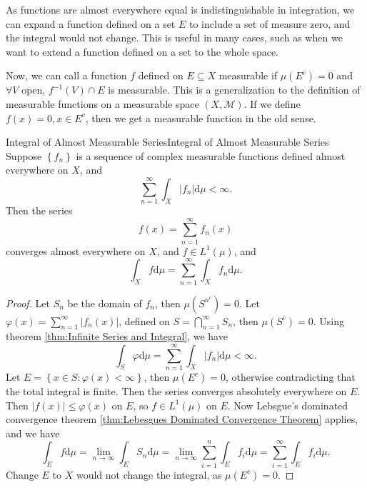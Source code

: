 \documentclass[../main.tex]{subfiles}
\begin{document}
\begin{remark}
	As functions are almost everywhere equal is indistinguishable in integration, we can expand a function defined on a set $E$ to include a set of measure zero, and the integral would not change. This is useful in many cases, such as when we want to extend a function defined on a set to the whole space.
\end{remark}

Now, we can call a function $f$ defined on $E \subseteq X$ measurable if $\mu(E^c)=0$ and $\forall V$ open, $f^{-1}(V)\cap E$ is measurable. This is a generalization to the definition of measurable functions on a measurable space $(X, \mathcal{M})$. If we define $f(x)=0,x\in E^c$, then we get a measurable function in the old sense.

\begin{theorem}{Integral of Almost Measurable Series}{Integral of Almost Measurable Series}
	Suppose $\left\{ f_n \right\}$ is a sequence of complex measurable functions defined almost everywhere on $X$, and
	\begin{equation*}
		\sum_{n=1}^{\infty} \int_X \left|f_n\right| \mathrm{d} \mu < \infty.
	\end{equation*}
	Then the series
	\begin{equation*}
		f(x) = \sum_{n=1}^{\infty} f_n(x)
	\end{equation*}
	converges almost everywhere on $X$, and $f\in L^1(\mu)$, and
	\begin{equation*}
		\int_X f \mathrm{d} \mu = \sum_{n=1}^{\infty} \int_X f_n \mathrm{d} \mu.
	\end{equation*}
\end{theorem}
\begin{proof}
	Let $S_n$ be the domain of $f_n$, then $\mu(S^n^c)=0$. Let $\varphi(x) = \sum_{n=1}^{\infty } \left|f_n(x)\right|$, defined on $S = \bigcap_{n=1}^{\infty } S_n$, then $\mu(S^c)=0$. Using theorem \ref{thm:Infinite Series and Integral}, we have
	\begin{equation*}
		\int_S \varphi \mathrm{d} \mu = \sum_{n=1}^{\infty } \int_X \left|f_n\right| \mathrm{d} \mu < \infty.
	\end{equation*}
	Let $E = \left\{ x\in S: \varphi(x) < \infty  \right\}$, then $\mu(E^c) = 0$, otherwise contradicting that the total integral is finite. Then the series converges absolutely everywhere on $E$. Then $\left|f(x)\right|\leq \varphi(x)$ on $E$, so $f\in L^1(\mu)$ on $E$. Now Lebsgue's dominated convergence theorem \ref{thm:Lebesgues Dominated Convergence Theorem} applies, and we have
	\begin{equation*}
		\int_E f \mathrm{d} \mu = \lim_{n\rightarrow \infty } \int_E S_n \mathrm{d} \mu = \lim_{n\rightarrow \infty } \sum_{i=1}^{n} \int_E f_i \mathrm{d} \mu = \sum_{i=1}^{\infty } \int_E f_i \mathrm{d} \mu.
	\end{equation*}
	Change $E$ to $X$ would not change the integral, as $\mu(E^c)=0$. 
\end{proof}
\end{document}
